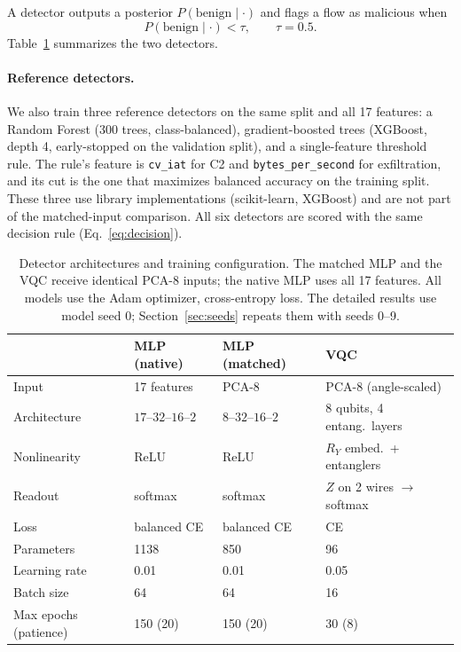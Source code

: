 \documentclass[preprint,12pt]{elsarticle}
\begin{document}
A detector outputs a posterior $P(\text{benign}\mid\cdot)$
and flags a flow as malicious when
\begin{equation}
P(\text{benign}\mid\cdot) < \tau, \qquad \tau = 0.5 .
\label{eq:decision}
\end{equation}
Table~\ref{tab:detectors} summarizes the two detectors.

\paragraph{Reference detectors.} We also train three reference detectors on the same split and all 17
features: a Random Forest (300 trees, class-balanced), gradient-boosted trees (XGBoost, depth 4,
early-stopped on the validation split), and a single-feature threshold rule. The rule's feature is
\texttt{cv\_iat} for C2 and \texttt{bytes\_per\_second} for exfiltration, and its cut is the one that
maximizes balanced accuracy on the training split.
These three use library implementations (scikit-learn, XGBoost) and are not part of the matched-input
comparison. All six detectors are scored with the same decision rule (Eq.~\ref{eq:decision}).

\begin{table}[htbp]
\centering
\caption{Detector architectures and training configuration. The matched MLP and the VQC receive
identical PCA-8 inputs; the native MLP uses all 17 features. All models use the Adam optimizer,
cross-entropy loss. The detailed results use model seed 0; Section~\ref{sec:seeds} repeats them
with seeds 0--9.}
\label{tab:detectors}
\setlength{\tabcolsep}{4.5pt}\small
\begin{tabular}{llll}
\toprule
 & MLP (native) & MLP (matched) & VQC \\
\midrule
Input                 & 17 features           & PCA-8                 & PCA-8 (angle-scaled) \\
Architecture          & $17$--$32$--$16$--$2$ & $8$--$32$--$16$--$2$  & 8 qubits, 4 entang.\ layers \\
Nonlinearity          & ReLU                  & ReLU                  & $R_Y$ embed.\ + entanglers \\
Readout               & softmax               & softmax               & $Z$ on 2 wires $\to$ softmax \\
Loss                  & balanced CE           & balanced CE           & CE \\
Parameters            & 1138                  & 850                   & 96 \\
Learning rate         & 0.01                  & 0.01                  & 0.05 \\
Batch size            & 64                    & 64                    & 16 \\
Max epochs (patience) & 150 (20)              & 150 (20)              & 30 (8) \\
\bottomrule
\end{tabular}
\end{table}
\end{document}
